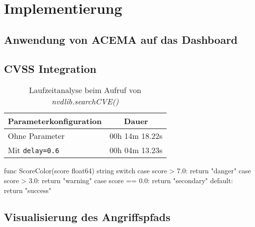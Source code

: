 \chapter{Implementierung}
\label{chap:implementierung}
\section[Anwendung von ACEMA]{Anwendung von ACEMA auf das Dashboard}
\label{sec:anwendungVonAcema}
\section{CVSS Integration}
\label{sec:cvssIntegration}

\begin{table}[H]
    \centering
    \caption{Laufzeitanalyse beim Aufruf von \textit{nvdlib.searchCVE()}}
    \begin{tabular}{|l|c|}
        \hline
        \textbf{Parameterkonfiguration} & \textbf{Dauer} \\
        \hline
        Ohne Parameter                & 00h 14m 18.22s \\
        Mit \texttt{delay=0.6}        & 00h 04m 13.23s \\
        \hline
    \end{tabular}
\end{table}

\begin{code}[caption={Implementierung der farblichen Kategorisierung von Schweregraden}]
func ScoreColor(score float64) string {
    switch {
    case score > 7.0:
        return "danger"
    case score > 3.0:
        return "warning"
    case score == 0.0:
        return "secondary"
    default:
        return "success"
    }
}
\end{code}

\section{Visualisierung des Angriffspfads}
\label{sec:visualisierungDesAngriffspfads}